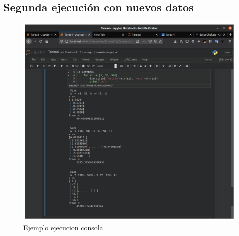 \documentclass[11pt]{article}
\begin{document}
\subsection{Segunda ejecuci\'on con nuevos datos}

\begin{figure}
\centering
\includegraphics{assets/T4-E2.png}
\caption{Ejemplo ejecucion consola}
\end{figure}
    
    
    
\end{document}
